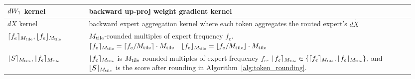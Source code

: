 \begin{table}[!ht]
\begin{center}
\begin{tabular}{p{0.15\linewidth}p{0.0\linewidth}p{0.80\linewidth}}
  $dW_{1}$ kernel &&  backward up-proj weight gradient kernel \\ \midrule
  
  $dX$ kernel &&  backward expert aggregation kernel where each token aggregates the routed expert's $d\tilde{X}$ \\ \midrule

 $\lceil f_e\rceil_{M_\mathrm{tile}}, \lfloor f_e\rfloor_{M_\mathrm{tile}}$ && $M_\mathrm{tile}$-rounded multiples of expert frequency $f_e$.  $\lceil f_e\rceil_{M_\mathrm{tile}} = \lceil f_e / M_\mathrm{tile} \rceil \cdot M_\mathrm{tile} \quad \lfloor f_e\rfloor_{M_\mathrm{tile}} = \lfloor f_e/M_\mathrm{tile} \rfloor \cdot M_\mathrm{tile}$ \\ \midrule

 $\lfloor S\rceil_{M_\mathrm{tile}}, \lfloor f_e\rceil_{M_\mathrm{tile}}$ && $\lfloor f_e\rceil_{M_\mathrm{tile}}$ is $M_\mathrm{tile}$-rounded multiples of expert frequency $f_e$.  $\lfloor f_e\rceil_{M_\mathrm{tile}} \in \{ \lceil f_e\rceil_{M_\mathrm{tile}}, \lfloor f_e\rfloor_{M_\mathrm{tile}} \}$, and $\lfloor S\rceil_{M_\mathrm{tile}}$ is the score after rounding in Algorithm~\ref{alg:token_rounding}.
  \\

    \bottomrule
    \end{tabular}
    \end{center}
\end{table}


\clearpage